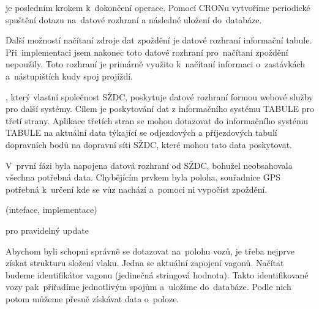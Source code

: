  je posledním krokem k~dokončení operace. Pomocí CRONu vytvoříme periodické spuštění dotazu na~datové rozhraní a následné uložení do~databáze.



Další možností načítaní zdroje dat zpoždění je datové rozhraní informační tabule. Při~implementaci jsem nakonec toto datové rozhraní pro~načítaní zpoždění nepoužily. Toto rozhraní je primárně  využito k~načítaní informaci o~zastávkách a~nástupištích kudy spoj projíždí.

, který vlastní společnost SŽDC, poskytuje datové rozhraní formou webové služby pro další systémy. Cílem je poskytování dat z informačního systému TABULE pro třetí strany. Aplikace třetích stran se mohou dotazovat do informačního systému TABULE na aktuální data týkající se odjezdových a příjezdových tabulí dopravních bodů na dopravní síti SŽDC, které mohou tato data poskytovat.

V~první fázi byla napojena datová rozhraní od SŽDC, bohužel neobsahovala všechna potřebná data. Chybějícím prvkem byla poloha, souřadnice GPS potřebná k~určení kde se vůz nachází a~pomoci ni vypočíst zpoždění.

 (inteface, implementace)
	
	
 pro pravidelný update


Abychom byli schopni správně se dotazovat na~polohu vozů, je třeba nejprve získat strukturu složení vlaku. Jedna se aktuální zapojení vagonů. Načítat budeme identifikátor vagonu (jedinečná stringová hodnota). Takto identifikované vozy pak~přiřadíme jednotlivým spojům a~uložíme do~databáze. Podle nich potom můžeme přesně získávat data o~poloze.

	
	
	
	
